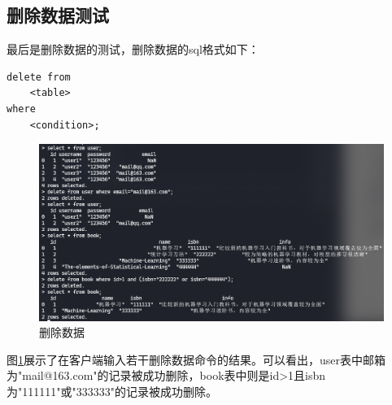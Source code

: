 \subsection{删除数据测试}

最后是删除数据的测试，删除数据的sql格式如下：

\begin{lstlisting}
delete from
    <table>
where 
    <condition>;
\end{lstlisting}

\begin{figure}[H]
    \includegraphics[width=\textwidth]{examples/删除.png}
    \centering
    \caption{删除数据}
    \label{fig:delete}
\end{figure}

图\ref{fig:delete}展示了在客户端输入若干删除数据命令的结果。可以看出，user表中邮箱为"mail@163.com"的记录被成功删除，book表中则是id>1且isbn为"111111"或"333333"的记录被成功删除。

